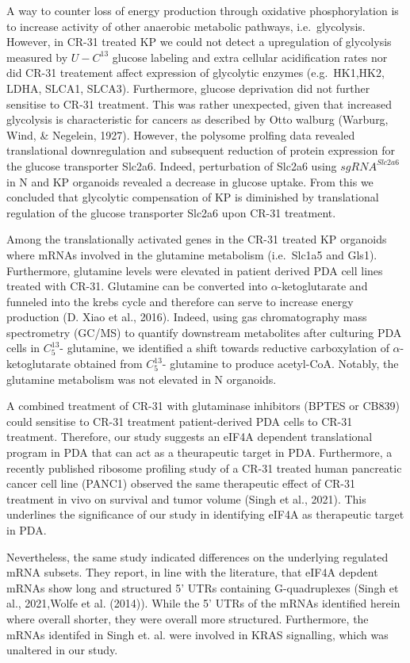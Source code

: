 \documentclass[12pt,openany]{book}
\begin{document}
A way to counter loss of energy production through oxidative
phosphorylation is to increase activity of other anaerobic metabolic
pathways, i.e.~glycolysis. However, in CR-31 treated KP we could not
detect a upregulation of glycolysis measured by \(U-C^{13}\) glucose
labeling and extra cellular acidification rates nor did CR-31 treatement
affect expression of glycolytic enzymes (e.g.~HK1,HK2, LDHA, SLCA1,
SLCA3). Furthermore, glucose deprivation did not further sensitise to
CR-31 treatment. This was rather unexpected, given that increased
glycolysis is characteristic for cancers as described by Otto walburg
(Warburg, Wind, \& Negelein, 1927). However, the polysome prolfing data
revealed translational downregulation and subsequent reduction of
protein expression for the glucose transporter Slc2a6. Indeed,
perturbation of Slc2a6 using \(sgRNA^{Slc2a6}\) in N and KP organoids
revealed a decrease in glucose uptake. From this we concluded that
glycolytic compensation of KP is diminished by translational regulation
of the glucose transporter Slc2a6 upon CR-31 treatment.

Among the translationally activated genes in the CR-31 treated KP
organoids where mRNAs involved in the glutamine metabolism (i.e.~Slc1a5
and Gls1). Furthermore, glutamine levels were elevated in patient
derived PDA cell lines treated with CR-31. Glutamine can be converted
into \(\alpha\)-ketoglutarate and funneled into the krebs cycle and
therefore can serve to increase energy production (D. Xiao et al.,
2016). Indeed, using gas chromatography mass spectrometry (GC/MS) to
quantify downstream metabolites after culturing PDA cells in
\(C_5^{13}\)- glutamine, we identified a shift towards reductive
carboxylation of \(\alpha\)-ketoglutarate obtained from \(C_5^{13}\)-
glutamine to produce acetyl-CoA. Notably, the glutamine metabolism was
not elevated in N organoids.

A combined treatment of CR-31 with glutaminase inhibitors (BPTES or
CB839) could sensitise to CR-31 treatment patient-derived PDA cells to
CR-31 treatment. Therefore, our study suggests an eIF4A dependent
translational program in PDA that can act as a theurapeutic target in
PDA. Furthermore, a recently published ribosome profiling study of a
CR-31 treated human pancreatic cancer cell line (PANC1) observed the
same therapeutic effect of CR-31 treatment in vivo on survival and tumor
volume (Singh et al., 2021). This underlines the significance of our
study in identifying eIF4A as therapeutic target in PDA.

Nevertheless, the same study indicated differences on the underlying
regulated mRNA subsets. They report, in line with the literature, that
eIF4A depdent mRNAs show long and structured 5' UTRs containing
G-quadruplexes (Singh et al., 2021,Wolfe et al. (2014)). While the 5'
UTRs of the mRNAs identified herein where overall shorter, they were
overall more structured. Furthermore, the mRNAs identifed in Singh et.
al. were involved in KRAS signalling, which was unaltered in our study.
\end{document}
